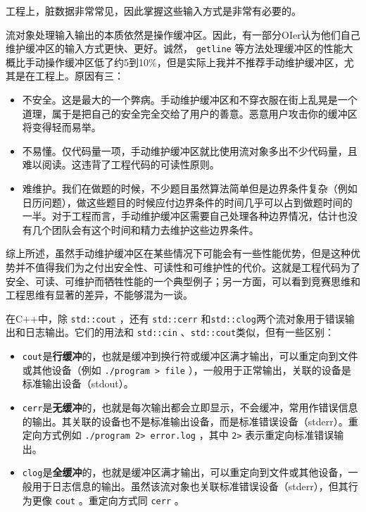 工程上，脏数据非常常见，因此掌握这些输入方式是非常有必要的。
\begin{caution}
  流对象处理输入输出的本质依然是操作缓冲区。因此，有一部分OIer认为他们自己维护缓冲区的输入方式更快、更好。诚然， \texttt{getline} 等方法处理缓冲区的性能大概比手动操作缓冲区低了约5到10\%，但是实际上我并不推荐手动维护缓冲区，尤其是在工程上。原因有三：
  \begin{itemize}
    \item 不安全。这是最大的一个弊病。手动维护缓冲区和不穿衣服在街上乱晃是一个道理，属于是把自己的安全完全交给了用户的善意。恶意用户攻击你的缓冲区将变得轻而易举。
    \item 不易懂。仅代码量一项，手动维护缓冲区就比使用流对象多出不少代码量，且难以阅读。这违背了工程代码的可读性原则。
    \item 难维护。我们在做题的时候，不少题目虽然算法简单但是边界条件复杂（例如日历问题），做这些题目的时候应付边界条件的时间几乎可以占到做题时间的一半。对于工程而言，手动维护缓冲区需要自己处理各种边界情况，估计也没有几个团队会有这个时间和精力去维护这些边界条件。
  \end{itemize}

  综上所述，虽然手动维护缓冲区在某些情况下可能会有一些性能优势，但是这种优势并不值得我们为之付出安全性、可读性和可维护性的代价。这就是工程代码为了安全、可读、可维护而牺牲性能的一个典型例子；另一方面，可以看到竞赛思维和工程思维有显著的差异，不能够混为一谈。
\end{caution}

\begin{tip}
    在C++中，除 \verb|std::cout| ，还有 \verb|std::cerr| 和\verb|std::clog|两个流对象用于错误输出和日志输出。它们的用法和 \verb|std::cin| 、\verb|std::cout|类似，但有一些区别：
    \begin{itemize}
        \item \verb|cout|是\textbf{行缓冲}的，也就是缓冲到换行符或缓冲区满才输出，可以重定向到文件或其他设备（例如 \verb|./program > file| ），一般用于正常输出，关联的设备是标准输出设备（stdout）。
        \item \verb|cerr|是\textbf{无缓冲}的，也就是每次输出都会立即显示，不会缓冲，常用作错误信息的输出。其关联的设备也不是标准输出设备，而是标准错误设备（stderr）。重定向方式例如 \verb|./program 2> error.log| ，其中 \verb|2>| 表示重定向标准错误输出。
        \item \verb|clog|是\textbf{全缓冲}的，也就是缓冲区满才输出，可以重定向到文件或其他设备，一般用于日志信息的输出。虽然该流对象也关联标准错误设备（stderr），但其行为更像 \verb|cout| 。重定向方式同 \verb|cerr| 。
    \end{itemize}
\end{tip}

